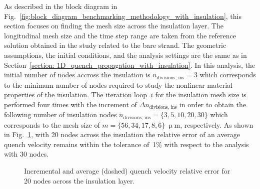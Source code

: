 
As described in the block diagram in Fig.~\ref{fig:block_diagram_benchmarking_methodology_with_insulation}, this section focuses on finding the mesh size across the insulation layer. The longitudinal mesh size and the time step range are taken from the reference solution obtained in the study related to the bare strand. The geometric assumptions, the initial conditions, and the analysis settings are the same as in Section~\ref{section: 1D_quench_propagation_with_insulation}. In this analysis, the initial number of nodes accross the insulation is $n_\text{divisions, ins}=3$ which corresponds to the minimum number of nodes required to study the nonlinear material properties of the insulation. The iteration loop~$i$ for the insulation mesh size is performed four times with the increment of $\Delta n_\text{divisions, ins}$ in order to obtain the following number of insulation nodes $n_\text{divisions, ins}=\{3, 5, 10, 20, 30\}$ which corresponds to the mesh size of $m=\{56, 34, 17, 8, 6\}~\upmu \text{m}$, respectively. As shown in Fig.~\ref{fig: q_vel_modelling_v_quench_rel_error_with_insulation}, with 20 nodes across the insulation the relative error of an average quench velocity remains within the tolerance of~1\% with respect to the analysis with 30 nodes. 

\begin{figure}[H]
\centering
    \caption{Incremental and average (dashed) quench velocity relative error for 20 nodes across the insulation layer.}
    \label{fig: q_vel_modelling_v_quench_rel_error_with_insulation}
\end{figure}

